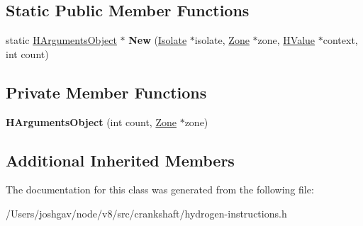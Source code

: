 \subsection*{Static Public Member Functions}
\begin{DoxyCompactItemize}
\item 
static \hyperlink{classv8_1_1internal_1_1_h_arguments_object}{H\+Arguments\+Object} $\ast$ {\bfseries New} (\hyperlink{classv8_1_1internal_1_1_isolate}{Isolate} $\ast$isolate, \hyperlink{classv8_1_1internal_1_1_zone}{Zone} $\ast$zone, \hyperlink{classv8_1_1internal_1_1_h_value}{H\+Value} $\ast$context, int count)\hypertarget{classv8_1_1internal_1_1_h_arguments_object_aadef61ddc8daecf30e15d5f1ba0be0c1}{}\label{classv8_1_1internal_1_1_h_arguments_object_aadef61ddc8daecf30e15d5f1ba0be0c1}

\end{DoxyCompactItemize}
\subsection*{Private Member Functions}
\begin{DoxyCompactItemize}
\item 
{\bfseries H\+Arguments\+Object} (int count, \hyperlink{classv8_1_1internal_1_1_zone}{Zone} $\ast$zone)\hypertarget{classv8_1_1internal_1_1_h_arguments_object_aec46ebccb9129cee5c32760b9ec6c308}{}\label{classv8_1_1internal_1_1_h_arguments_object_aec46ebccb9129cee5c32760b9ec6c308}

\end{DoxyCompactItemize}
\subsection*{Additional Inherited Members}


The documentation for this class was generated from the following file\+:\begin{DoxyCompactItemize}
\item 
/\+Users/joshgav/node/v8/src/crankshaft/hydrogen-\/instructions.\+h\end{DoxyCompactItemize}
